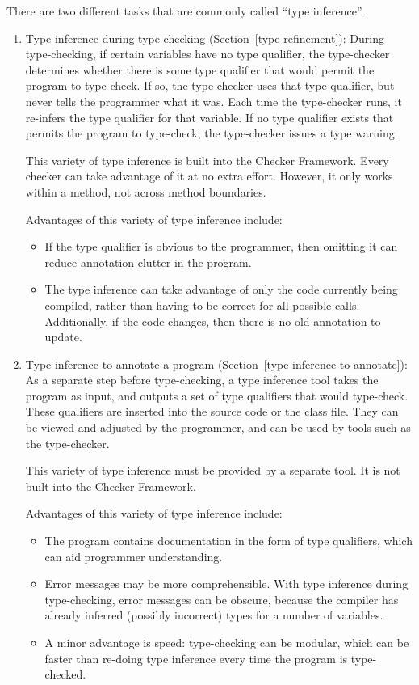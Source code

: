 There are two different tasks that are commonly called ``type inference''.

\begin{enumerate}
\item
  Type inference during type-checking (Section~\ref{type-refinement}):
  During type-checking, if certain variables have no type qualifier, the
  type-checker determines whether there is some type qualifier that would
  permit the program to type-check.  If so, the type-checker uses that type
  qualifier, but never tells the programmer what it was.  Each time the
  type-checker runs, it re-infers the type qualifier for that variable.  If
  no type qualifier exists that permits the program to type-check, the
  type-checker issues a type warning.

  This variety of type inference is built into the Checker Framework.  Every
  checker can take advantage of it at no extra effort.  However, it only
  works within a method, not across method boundaries.

  Advantages of this variety of type inference include:
  \begin{itemize}
  \item
    If the type qualifier is obvious to the programmer, then omitting it
    can reduce annotation clutter in the program.
  \item
    The type inference can take advantage of only the code currently being
    compiled, rather than having to be correct for all possible calls.
    Additionally, if the code changes, then there is no old annotation to
    update.
  \end{itemize}


\item
  Type inference to annotate a program (Section~\ref{type-inference-to-annotate}):
  As a separate step before type-checking, a type inference tool takes the
  program as input, and outputs a set of type qualifiers that would
  type-check.  These qualifiers are inserted into the source code or the
  class file.  They can be viewed and adjusted by the programmer, and can
  be used by tools such as the type-checker.

  This variety of type inference must be provided by a separate tool.  It
  is not built into the Checker Framework.

  Advantages of this variety of type inference include:
  \begin{itemize}
  \item
    The program contains documentation in the form of type qualifiers,
    which can aid programmer understanding.
  \item
    Error messages may be more comprehensible.  With type inference
    during type-checking, error messages can be obscure, because the
    compiler has already inferred (possibly incorrect) types for a number
    of variables.
  \item
    A minor advantage is speed:  type-checking can be modular, which can be
    faster than re-doing type inference every time the
    program is type-checked.
  \end{itemize}

\end{enumerate}

